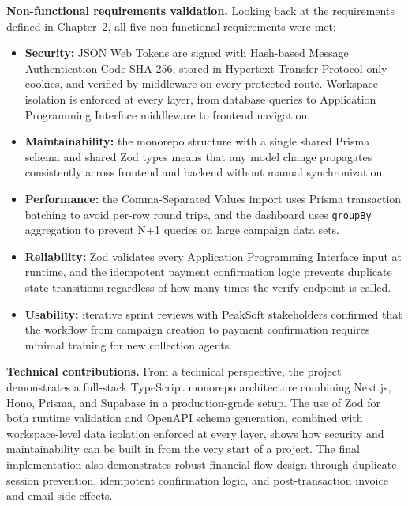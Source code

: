 ﻿\documentclass[12pt,a4paper]{report}
\begin{document}
\textbf{Non-functional requirements validation.}
Looking back at the requirements defined in Chapter~2, all five non-functional
requirements were met:
\begin{itemize}
  \item \textbf{Security:} JSON Web Tokens are signed with Hash-based Message Authentication Code SHA-256, stored in
        Hypertext Transfer Protocol-only cookies, and verified by middleware on every protected route.
        Workspace isolation is enforced at every layer, from database queries to
        Application Programming Interface middleware to frontend navigation.
  \item \textbf{Maintainability:} the monorepo structure with a single shared
        Prisma schema and shared Zod types means that any model change propagates
        consistently across frontend and backend without manual synchronization.
  \item \textbf{Performance:} the Comma-Separated Values import uses Prisma transaction batching to
        avoid per-row round trips, and the dashboard uses \texttt{groupBy}
        aggregation to prevent N+1 queries on large campaign data sets.
  \item \textbf{Reliability:} Zod validates every Application Programming Interface input at runtime, and the
        idempotent payment confirmation logic prevents duplicate state transitions
        regardless of how many times the verify endpoint is called.
  \item \textbf{Usability:} iterative sprint reviews with PeakSoft stakeholders
        confirmed that the workflow from campaign creation to payment confirmation
        requires minimal training for new collection agents.
\end{itemize}

\textbf{Technical contributions.}
From a technical perspective, the project demonstrates a full-stack TypeScript
monorepo architecture combining Next.js, Hono, Prisma, and Supabase in a
production-grade setup.
The use of Zod for both runtime validation and OpenAPI schema generation, combined
with workspace-level data isolation enforced at every layer, shows how security and
maintainability can be built in from the very start of a project.
The final implementation also demonstrates robust financial-flow design through
duplicate-session prevention, idempotent confirmation logic, and post-transaction
invoice and email side effects.
\end{document}
